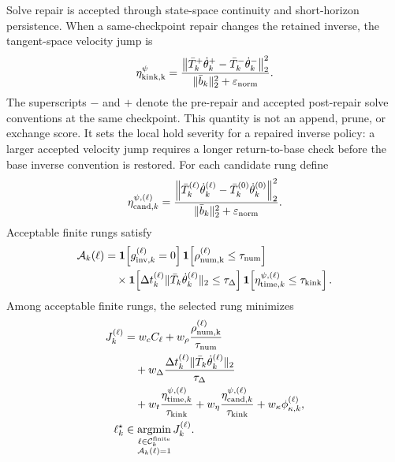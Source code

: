 \documentclass[
  reprint,
  amsmath,
  amssymb,
  aps,
  pra,
  nofootinbib,
  superscriptaddress,
  floatfix
]{revtex4-2}
\newcommand{\eps}{\varepsilon}
\begin{document}
Solve repair is accepted through state-space continuity and short-horizon persistence.  When a same-checkpoint repair changes the retained inverse, the tangent-space velocity jump is
\begin{equation}
\eta_{\rm kink,k}^{\psi}
=
\frac{
\left\|
\bar T_k^{+}\dot\theta_k^{+}
-
\bar T_k^{-}\dot\theta_k^{-}
\right\|_2^2
}{
\|\bar b_k\|_2^2+\eps_{\rm norm}
}.
\label{eq:state_space_kink_diagnostic}
\end{equation}
The superscripts $-$ and $+$ denote the pre-repair and accepted post-repair solve conventions at the same checkpoint.  This quantity is not an append, prune, or exchange score.  It sets the local hold severity for a repaired inverse policy: a larger accepted velocity jump requires a longer return-to-base check before the base inverse convention is restored.  For each candidate rung define
\begin{equation}
\eta_{{\rm cand},k}^{\psi,(\ell)}
=
\frac{
\left\|
\bar T_k^{(\ell)}\dot\theta_k^{(\ell)}
-
\bar T_k^{(0)}\dot\theta_k^{(0)}
\right\|_2^2
}{
\|\bar b_k\|_2^2+\eps_{\rm norm}
}.
\label{eq:candidate_repair_kink}
\end{equation}
Acceptable finite rungs satisfy
\begin{equation}
\begin{aligned}
\mathcal A_k(\ell)
&=
\mathbf 1\!\left[g_{{\rm inv},k}^{(\ell)}=0\right]
\mathbf 1\!\left[\rho_{\rm num,k}^{(\ell)}\le\tau_{\rm num}\right]
\\
&\quad
\times
\mathbf 1\!\left[
\Delta t_k^{(\ell)}
\|\bar T_k\dot\theta_k^{(\ell)}\|_2\le\tau_\Delta
\right]
\mathbf 1\!\left[
\eta_{{\rm time},k}^{\psi,(\ell)}\le\tau_{\rm kink}
\right].
\end{aligned}
\label{eq:repair_acceptability}
\end{equation}
Among acceptable finite rungs, the selected rung minimizes
\begin{equation}
\begin{aligned}
J_k^{(\ell)}
&=
w_c C_\ell
+w_\rho
\frac{\rho_{\rm num,k}^{(\ell)}}{\tau_{\rm num}}
\\
&\quad
+w_\Delta
\frac{
\Delta t_k^{(\ell)}
\|\bar T_k\dot\theta_k^{(\ell)}\|_2
}{\tau_\Delta}
\\
&\quad
+w_t
\frac{\eta_{{\rm time},k}^{\psi,(\ell)}}{\tau_{\rm kink}}
+w_\eta
\frac{\eta_{{\rm cand},k}^{\psi,(\ell)}}{\tau_{\rm kink}}
+w_\kappa\phi_{\kappa,k}^{(\ell)},
\\
\ell_k^\star
&\in
\operatorname*{argmin}_{\substack{\ell\in\mathcal C_k^{\rm finite}\\ \mathcal A_k(\ell)=1}}
J_k^{(\ell)} .
\end{aligned}
\label{eq:numerical_repair_selection}
\end{equation}
\end{document}
